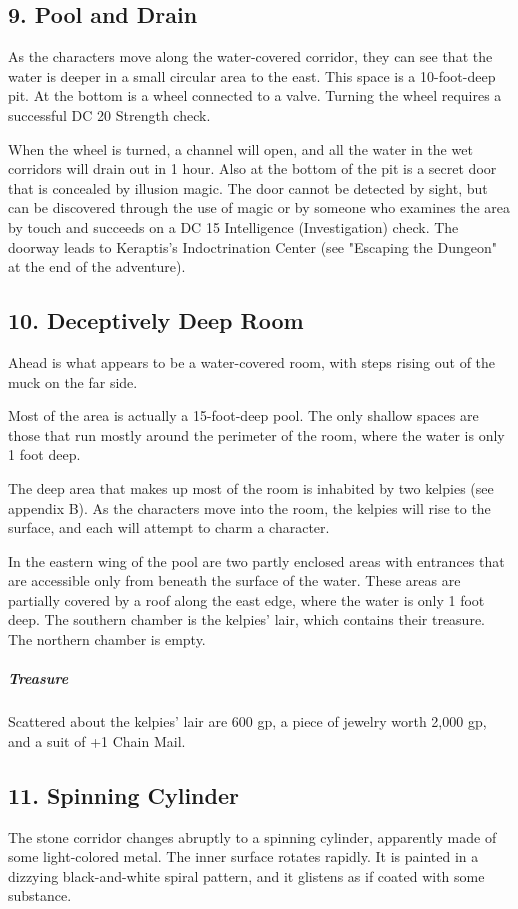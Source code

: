 \documentclass[10pt,a4paper,twoside,bg=print,twocolumn,openany,nodeprecatedcode]{dndbook}
\begin{document}
\subsection{9. Pool and Drain}
As the characters move along the water-covered corridor, they can see that the water is deeper in a small circular area to the east. This space is a 10-foot-deep pit. At the bottom is a wheel connected to a valve. Turning the wheel requires a successful DC 20 Strength check.

When the wheel is turned, a channel will open, and all the water in the wet corridors will drain out in 1 hour. Also at the bottom of the pit is a secret door that is concealed by illusion magic. The door cannot be detected by sight, but can be discovered through the use of magic or by someone who examines the area by touch and succeeds on a DC 15 Intelligence (Investigation) check. The doorway leads to Keraptis's Indoctrination Center (see "Escaping the Dungeon" at the end of the adventure).

\subsection{10. Deceptively Deep Room}
\begin{DndReadAloud}{}
Ahead is what appears to be a water-covered room, with steps rising out of the muck on the far side.

\end{DndReadAloud}

Most of the area is actually a 15-foot-deep pool. The only shallow spaces are those that run mostly around the perimeter of the room, where the water is only 1 foot deep.

The deep area that makes up most of the room is inhabited by two kelpies (see appendix B). As the characters move into the room, the kelpies will rise to the surface, and each will attempt to charm a character.

In the eastern wing of the pool are two partly enclosed areas with entrances that are accessible only from beneath the surface of the water. These areas are partially covered by a roof along the east edge, where the water is only 1 foot deep. The southern chamber is the kelpies' lair, which contains their treasure. The northern chamber is empty.

\subparagraph{Treasure}
Scattered about the kelpies' lair are 600 gp, a piece of jewelry worth 2,000 gp, and a suit of +1 Chain Mail.

\subsection{11. Spinning Cylinder}
\begin{DndReadAloud}{}
The stone corridor changes abruptly to a spinning cylinder, apparently made of some light-colored metal. The inner surface rotates rapidly. It is painted in a dizzying black-and-white spiral pattern, and it glistens as if coated with some substance.

\end{DndReadAloud}
\end{document}
